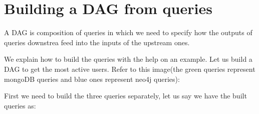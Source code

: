 \documentclass[letterpaper,10pt,english]{sphinxmanual}
\begin{document}
\section{Building a DAG from queries}
\label{\detokenize{dag:building-a-dag-from-queries}}
A DAG is composition of queries in which we need to specify how the outputs of queries downstrea feed into the inputs of the upstream ones.

We explain how to build the queries with the help on an example. Let us build a DAG to get the most active users. Refer to this image(the green queries represent mongoDB queries and blue ones represent neo4j queries):

\noindent{}

First we need to build the three queries separately, let us say we have the built queries as:
\end{document}
